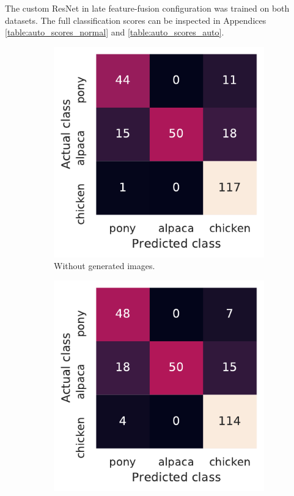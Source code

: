 \documentclass{l4proj}
\begin{document}
The custom ResNet in late feature-fusion configuration was trained on both datasets. The full classification scores can be inspected in Appendices \ref{table:auto_scores_normal} and \ref{table:auto_scores_auto}. 

\begin{figure}[ht]
  \centering
  \begin{subfigure}[h!]{0.3\textwidth}
    \includegraphics[width=\textwidth]{images/evaluation/autoencoder/confusion_normal}
    \caption{Without generated images.}
    \label{fig:auto_confusion_normal}
  \end{subfigure}
  \begin{subfigure}[h!]{0.3\textwidth}
    \includegraphics[width=\textwidth]{images/evaluation/autoencoder/confusion_autoencoder}

\end{subfigure}
\end{figure}
\end{document}
